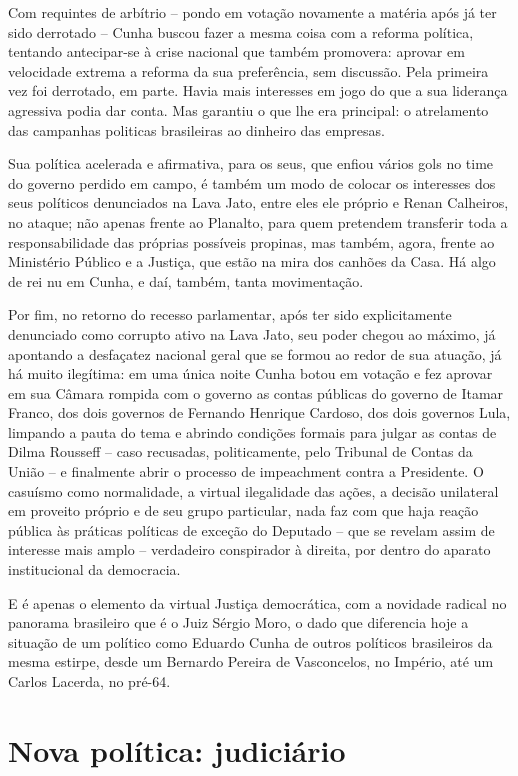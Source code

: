 Com requintes de arbítrio -- pondo em votação novamente a matéria após
já ter sido derrotado -- Cunha buscou fazer a mesma coisa com a reforma
política, tentando antecipar-se à crise nacional que também promovera:
aprovar em velocidade extrema a reforma da sua preferência, sem
discussão. Pela primeira vez foi derrotado, em parte. Havia mais
interesses em jogo do que a sua liderança agressiva podia dar conta. Mas
garantiu o que lhe era principal: o atrelamento das campanhas politicas
brasileiras ao dinheiro das empresas.

Sua política acelerada e afirmativa, para os seus, que enfiou vários
gols no time do governo perdido em campo, é também um modo de colocar os
interesses dos seus políticos denunciados na Lava Jato, entre eles ele
próprio e Renan Calheiros, no ataque; não apenas frente ao Planalto,
para quem pretendem transferir toda a responsabilidade das próprias
possíveis propinas, mas também, agora, frente ao Ministério Público e a
Justiça, que estão na mira dos canhões da Casa. Há algo de rei nu em
Cunha, e daí, também, tanta movimentação.

Por fim, no retorno do recesso parlamentar, após ter sido explicitamente
denunciado como corrupto ativo na Lava Jato, seu poder chegou ao máximo,
já apontando a desfaçatez nacional geral que se formou ao redor de sua
atuação, já há muito ilegítima: em uma única noite Cunha botou em
votação e fez aprovar em sua Câmara rompida com o governo as contas
públicas do governo de Itamar Franco, dos dois governos de Fernando
Henrique Cardoso, dos dois governos Lula, limpando a pauta do tema e
abrindo condições formais para julgar as contas de Dilma Rousseff --
caso recusadas, politicamente, pelo Tribunal de Contas da União -- e
finalmente abrir o processo de impeachment contra a Presidente. O
casuísmo como normalidade, a virtual ilegalidade das ações, a decisão
unilateral em proveito próprio e de seu grupo particular, nada faz com
que haja reação pública às práticas políticas de exceção do Deputado --
que se revelam assim de interesse mais amplo -- verdadeiro conspirador à
direita, por dentro do aparato institucional da democracia.

E é apenas o elemento da virtual Justiça democrática, com a novidade
radical no panorama brasileiro que é o Juiz Sérgio Moro, o dado que
diferencia hoje a situação de um político como Eduardo Cunha de outros
políticos brasileiros da mesma estirpe, desde um Bernardo Pereira de
Vasconcelos, no Império, até um Carlos Lacerda, no pré-64.

  \section{Nova política:
  judiciário}\label{nova-poluxedtica-judiciuxe1rio}

